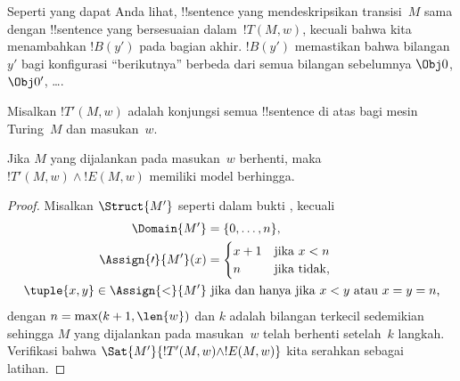 \documentclass[../../../include/open-logic-section]{subfiles}
\begin{document}
\begin{enumerate}
\begin{enumerate}
\end{enumerate}
Seperti yang dapat Anda lihat, !!{sentence} yang mendeskripsikan transisi~$M$
sama dengan !!{sentence} yang bersesuaian dalam~$!T(M,w)$, kecuali bahwa kita
menambahkan $!B(y')$ pada bagian akhir. $!B(y')$ memastikan bahwa bilangan
$y'$ bagi konfigurasi ``berikutnya'' berbeda dari semua bilangan sebelumnya
$\Obj 0$, $\Obj 0'$, \dots.
\end{enumerate}
Misalkan $!T'(M, w)$ adalah konjungsi semua !!{sentence} di atas bagi mesin
Turing~$M$ dan masukan~$w$.

\begin{lem}
  Jika $M$ yang dijalankan pada masukan~$w$ berhenti, maka
  $!T'(M,w) \land !E(M,w)$ memiliki model berhingga.
\end{lem}

\begin{proof}
  Misalkan $\Struct{M'}$ seperti dalam bukti
  , kecuali
  \begin{align*}
    \Domain{M'} & = \{0, \dots, n\},\\
    \Assign{\prime}{M'}(x) & =
    \begin{cases}
      x + 1 &\text{jika $x < n$}\\
      n &\text{jika tidak,}
    \end{cases} \\
    \tuple{x,y} \in \Assign{<}{M'} &\text{ jika dan hanya jika
      $x < y$ atau $x = y = n$,}
  \end{align*}
  dengan $n = \max(k+1,\len{w})$ dan $k$ adalah bilangan terkecil sedemikian
  sehingga $M$ yang dijalankan pada masukan~$w$ telah berhenti setelah~$k$
  langkah. Verifikasi bahwa $\Sat{M'}{!T'(M,w) \land !E(M,w)}$ kita serahkan
  sebagai latihan.
\end{proof}
\end{document}
